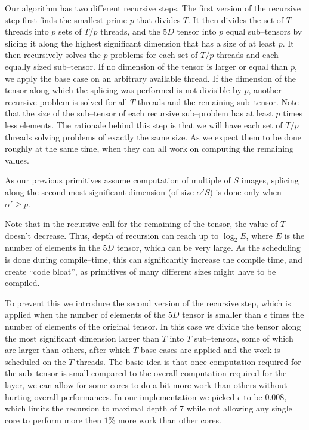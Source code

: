   Our algorithm has two different recursive steps.  The first version
  of the recursive step first finds the smallest prime $p$ that
  divides $T$.  It then divides the set of $T$ threads into $p$ sets
  of $T/p$ threads, and the $5D$ tensor into $p$ equal sub--tensors by
  slicing it along the highest significant dimension that has a size
  of at least $p$.  It then recursively solves the $p$ problems for
  each set of $T/p$ threads and each equally sized sub--tensor.  If no
  dimension of the tensor is larger or equal than $p$, we apply the
  base case on an arbitrary available thread.  If the dimension of the
  tensor along which the splicing was performed is not divisible by
  $p$, another recursive problem is solved for all $T$ threads and the
  remaining sub--tensor.  Note that the size of the sub--tensor of
  each recursive sub--problem has at least $p$ times less elements.
  The rationale behind this step is that we will have each set of
  $T/p$ threads solving problems of exactly the same size.  As we
  expect them to be done roughly at the same time, when they can all
  work on computing the remaining values.

  As our previous primitives assume computation of multiple of $S$
  images, splicing along the second most significant dimension (of
  size $\alpha'S$) is done only when $\alpha' \ge p$.

  Note that in the recursive call for the remaining of the tensor, the
  value of $T$ doesn't decrease.  Thus, depth of recursion can reach
  up to $\log_2 E$, where $E$ is the number of elements in the $5D$
  tensor, which can be very large.  As the scheduling is done during
  compile--time, this can significantly increase the compile time, and
  create ``code bloat'', as primitives of many different sizes might
  have to be compiled.

  To prevent this we introduce the second version of the recursive
  step, which is applied when the number of elements of the $5D$
  tensor is smaller than $\epsilon$ times the number of elements of
  the original tensor.  In this case we divide the tensor along the
  most significant dimension larger than $T$ into $T$ sub--tensors,
  some of which are larger than others, after which $T$ base cases are
  applied and the work is scheduled on the $T$ threads.  The basic
  idea is that once computation required for the sub--tensor is small
  compared to the overall computation required for the layer, we can
  allow for some cores to do a bit more work than others without
  hurting overall performances.  In our implementation we picked
  $\epsilon$ to be $0.008$, which limits the recursion to maximal
  depth of $7$ while not allowing any single core to perform more then
  $1\%$ more work than other cores.


